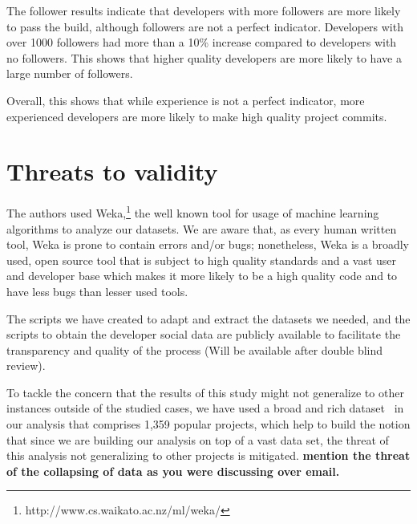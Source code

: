 \documentclass[10pt, conference]{IEEEtran}
\newcommand{\todo}[1]
  {{\scriptsize \textbf{\color{red} {#1}}}}
\begin{document}
The follower results indicate that developers with more followers are more
likely to pass the build, although followers are not a perfect indicator.
Developers with over 1000 followers had more than a 10\% increase compared to
developers with no followers.  This shows that higher quality developers are more
likely to have a large number of followers.

Overall, this shows that while experience is not a perfect indicator, more
experienced developers are more likely to make high quality project commits.

\section{Threats to validity}

 The authors used 
 Weka,\footnote{http://www.cs.waikato.ac.nz/ml/weka/} the well known tool for 
 usage of machine learning algorithms to analyze our datasets. We are aware that, 
 as every human written tool, Weka is prone to contain errors and/or bugs; 
 nonetheless, Weka is a broadly used, open source tool that is subject to high 
 quality standards and a vast user and developer base which makes it more likely 
 to be a high quality code and to have less bugs than lesser used tools.
 
 The scripts we have created to adapt and extract the datasets we needed, and the 
 scripts to obtain the developer social data are publicly available to facilitate 
 the transparency and quality of the process (Will be available after double blind review).%

 To tackle the concern that the results of this study might not generalize to 
 other instances outside of the studied cases, we have used a broad and rich 
 dataset~\cite{msr17challenge} in our analysis that comprises 1,359 popular projects, which help to 
 build the notion that since we are building our analysis on top of a vast 
 data set, the threat of this analysis 
 not generalizing to other projects is mitigated.
\todo{mention the threat of the collapsing of data as you were discussing over email.}
\end{document}
